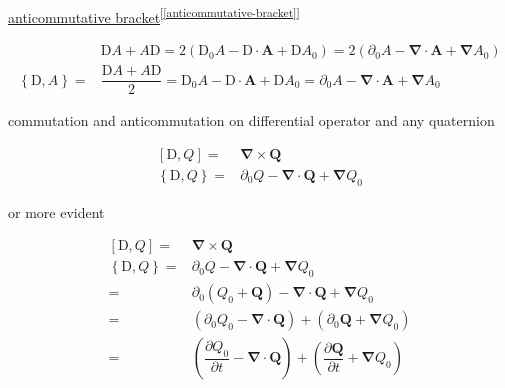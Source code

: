 \documentclass[
]{book}
\theoremstyle{definition}
\theoremstyle{definition}
\theoremstyle{definition}
\theoremstyle{definition}
\theoremstyle{remark}
\begin{document}
\protect\hyperlink{anticommutative-bracket}{anticommutative bracket}\textsuperscript{{[}\ref{anticommutative-bracket}{]}}

\[
\begin{aligned}
 & \mathrm{D}A+A\mathrm{D}=2\left(\mathrm{D}_{{\scriptscriptstyle 0}}A-\boldsymbol{\mathrm{D}}\cdot\boldsymbol{A}+\boldsymbol{\mathrm{D}}A_{{\scriptscriptstyle 0}}\right)=2\left(\partial_{{\scriptscriptstyle 0}}A-\boldsymbol{\nabla}\cdot\boldsymbol{A}+\boldsymbol{\nabla}A_{{\scriptscriptstyle 0}}\right)\\
\left\{ \mathrm{D},A\right\} = & \dfrac{\mathrm{D}A+A\mathrm{D}}{2}=\mathrm{D}_{{\scriptscriptstyle 0}}A-\boldsymbol{\mathrm{D}}\cdot\boldsymbol{A}+\boldsymbol{\mathrm{D}}A_{{\scriptscriptstyle 0}}=\partial_{{\scriptscriptstyle 0}}A-\boldsymbol{\nabla}\cdot\boldsymbol{A}+\boldsymbol{\nabla}A_{{\scriptscriptstyle 0}}
\end{aligned}
\]

commutation and anticommutation on differential operator and any quaternion

\[
\begin{aligned}
\left[\mathrm{D},Q\right]= & \boldsymbol{\nabla}\times\boldsymbol{Q}\\
\left\{ \mathrm{D},Q\right\} = & \partial_{{\scriptscriptstyle 0}}Q-\boldsymbol{\nabla}\cdot\boldsymbol{Q}+\boldsymbol{\nabla}Q_{{\scriptscriptstyle 0}}
\end{aligned}
\]

or more evident

\[
\begin{aligned}
\left[\mathrm{D},Q\right]= & \boldsymbol{\nabla}\times\boldsymbol{Q}\\
\left\{ \mathrm{D},Q\right\} = & \partial_{{\scriptscriptstyle 0}}Q-\boldsymbol{\nabla}\cdot\boldsymbol{Q}+\boldsymbol{\nabla}Q_{{\scriptscriptstyle 0}}\\
= & \partial_{{\scriptscriptstyle 0}}\left(Q_{{\scriptscriptstyle 0}}+\boldsymbol{Q}\right)-\boldsymbol{\nabla}\cdot\boldsymbol{Q}+\boldsymbol{\nabla}Q_{{\scriptscriptstyle 0}}\\
= & \left(\partial_{{\scriptscriptstyle 0}}Q_{{\scriptscriptstyle 0}}-\boldsymbol{\nabla}\cdot\boldsymbol{Q}\right)+\left(\partial_{{\scriptscriptstyle 0}}\boldsymbol{Q}+\boldsymbol{\nabla}Q_{{\scriptscriptstyle 0}}\right)\\
= & \left(\dfrac{\partial Q_{{\scriptscriptstyle 0}}}{\partial t}-\boldsymbol{\nabla}\cdot\boldsymbol{Q}\right)+\left(\dfrac{\partial\boldsymbol{Q}}{\partial t}+\boldsymbol{\nabla}Q_{{\scriptscriptstyle 0}}\right)
\end{aligned}
\]
\end{document}
